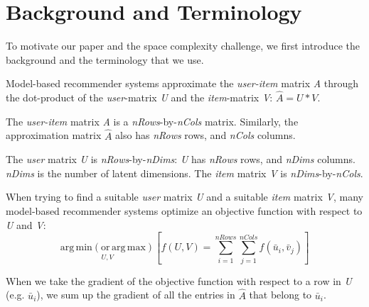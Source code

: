 \section{Background and Terminology}
To motivate our paper and the space complexity challenge, we first introduce the background and the terminology that we use.  


Model-based recommender systems approximate the \emph{user-item} matrix \emph{A} through the dot-product of the \emph{user}-matrix \emph{U} and the \emph{item}-matrix \emph{V}: $\hat{A} = U * V.$  

The \emph{user-item} matrix \emph{A} is a \emph{nRows}-by-\emph{nCols} matrix.  
Similarly, the approximation matrix $\hat{A}$ also has \emph{nRows} rows, and \emph{nCols} columns.  

The \emph{user} matrix \emph{U} is \emph{nRows}-by-\emph{nDims}: \emph{U} has \emph{nRows} rows, and \emph{nDims} columns.  
\emph{nDims} is the number of latent dimensions.  
The \emph{item} matrix \emph{V} is \emph{nDims}-by-\emph{nCols}.  


When trying to find a suitable \emph{user} matrix \emph{U} and a suitable \emph{item} matrix \emph{V}, 
many model-based recommender systems optimize an objective function with respect to \emph{U} and \emph{V}: 
\[ 
\operatorname*{arg\,min (or\,arg\,max)}_{U,V} \left[ f(U, V) = \sum_{i=1}^{nRows} \sum_{j=1}^{nCols} f(\bar{u}_{i}, \bar{v}_{j}) \right]
\]

When we take the gradient of the objective function with respect to a row in \emph{U} (e.g. $\bar{u}_{i}$), 
we sum up the gradient of all the entries in $\hat{A}$ that belong to $\bar{u}_{i}$.  
